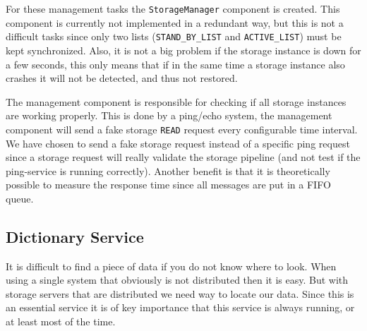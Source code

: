 \documentclass[12pt,a4paper]{scrartcl}
\begin{document}
For these management tasks the \verb|StorageManager| component is created. This component is currently not implemented in a redundant way, but this is not a difficult tasks since only two lists (\verb|STAND_BY_LIST| and \verb|ACTIVE_LIST|) must be kept synchronized. Also, it is not a big problem if the storage instance is down for a few seconds, this only means that if in the same time a storage instance also crashes it will not be detected, and thus not restored.

The management component is responsible for checking if all storage instances are working properly. This is done by a ping/echo system, the management component will send a fake storage \verb|READ| request every configurable time interval. We have chosen to send a fake storage request instead of a specific ping request since a storage request will really validate the storage pipeline (and not test if the ping-service is running correctly). Another benefit is that it is theoretically possible to measure the response time since all messages are put in a FIFO queue.

\subsection{Dictionary Service}

It is difficult to find a piece of data if you do not know where to look. When using a single system that obviously is not distributed then it is easy. But with storage servers that are distributed we need way to locate our data. Since this is an essential service it is of key importance that this service is always running, or at least most of the time. 
\end{document}
